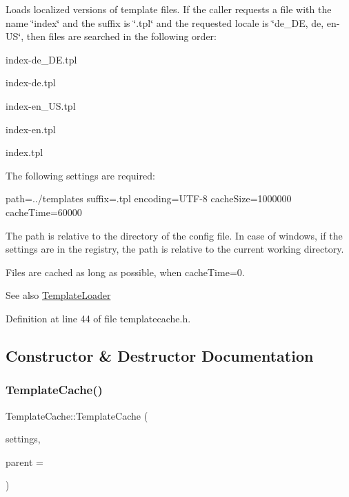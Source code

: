 Loads localized versions of template files. If the caller requests a file with the name \char`\"{}index\char`\"{} and the suffix is \char`\"{}.\+tpl\char`\"{} and the requested locale is \char`\"{}de\+\_\+\+D\+E, de, en-\/\+U\+S\char`\"{}, then files are searched in the following order\+:


\begin{DoxyItemize}
\item index-\/de\+\_\+\+D\+E.\+tpl
\item index-\/de.\+tpl
\item index-\/en\+\_\+\+U\+S.\+tpl
\item index-\/en.\+tpl
\item index.\+tpl 
\end{DoxyItemize}

The following settings are required\+: {\ttfamily 
\begin{DoxyPre}
path=../templates
suffix=.tpl
encoding=UTF-8
cacheSize=1000000
cacheTime=60000
\end{DoxyPre}
} The path is relative to the directory of the config file. In case of windows, if the settings are in the registry, the path is relative to the current working directory. 

Files are cached as long as possible, when cache\+Time=0. \begin{DoxySeeAlso}{See also}
\mbox{\hyperlink{classstefanfrings_1_1_template_loader}{Template\+Loader}} 
\end{DoxySeeAlso}


Definition at line 44 of file templatecache.\+h.



\subsection{Constructor \& Destructor Documentation}
\mbox{\label{classstefanfrings_1_1_template_cache_aef9bd0bd1ca5a4592054e1608eae80dc}} 
\subsubsection{\texorpdfstring{Template\+Cache()}{TemplateCache()}}
{\footnotesize\ttfamily Template\+Cache\+::\+Template\+Cache (\begin{DoxyParamCaption}\item[{Q\+Settings $\ast$}]{settings,  }\item[{Q\+Object $\ast$}]{parent = {} }\end{DoxyParamCaption})}

